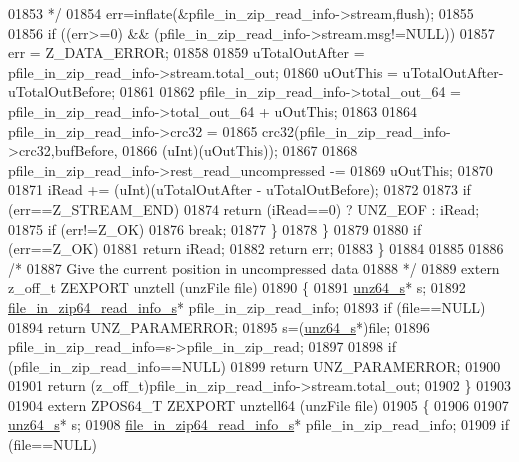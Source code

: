\begin{DoxyCode}
01853 \textcolor{comment}{            */}
01854             err=inflate(&pfile\_in\_zip\_read\_info->stream,flush);
01855 
01856             \textcolor{keywordflow}{if} ((err>=0) && (pfile\_in\_zip\_read\_info->stream.msg!=NULL))
01857               err = Z\_DATA\_ERROR;
01858 
01859             uTotalOutAfter = pfile\_in\_zip\_read\_info->stream.total\_out;
01860             uOutThis = uTotalOutAfter-uTotalOutBefore;
01861 
01862             pfile\_in\_zip\_read\_info->total\_out\_64 = pfile\_in\_zip\_read\_info->total\_out\_64 + uOutThis;
01863 
01864             pfile\_in\_zip\_read\_info->crc32 =
01865                 crc32(pfile\_in\_zip\_read\_info->crc32,bufBefore,
01866                         (uInt)(uOutThis));
01867 
01868             pfile\_in\_zip\_read\_info->rest\_read\_uncompressed -=
01869                 uOutThis;
01870 
01871             iRead += (uInt)(uTotalOutAfter - uTotalOutBefore);
01872 
01873             \textcolor{keywordflow}{if} (err==Z\_STREAM\_END)
01874                 \textcolor{keywordflow}{return} (iRead==0) ? UNZ\_EOF : iRead;
01875             \textcolor{keywordflow}{if} (err!=Z\_OK)
01876                 \textcolor{keywordflow}{break};
01877         \}
01878     \}
01879 
01880     \textcolor{keywordflow}{if} (err==Z\_OK)
01881         \textcolor{keywordflow}{return} iRead;
01882     \textcolor{keywordflow}{return} err;
01883 \}
01884 
01885 
01886 \textcolor{comment}{/*}
01887 \textcolor{comment}{  Give the current position in uncompressed data}
01888 \textcolor{comment}{*/}
01889 \textcolor{keyword}{extern} z\_off\_t ZEXPORT unztell (unzFile file)
01890 \{
01891     \hyperlink{structunz64__s}{unz64\_s}* s;
01892     \hyperlink{structfile__in__zip64__read__info__s}{file\_in\_zip64\_read\_info\_s}* pfile\_in\_zip\_read\_info;
01893     \textcolor{keywordflow}{if} (file==NULL)
01894         \textcolor{keywordflow}{return} UNZ\_PARAMERROR;
01895     s=(\hyperlink{structunz64__s}{unz64\_s}*)file;
01896     pfile\_in\_zip\_read\_info=s->pfile\_in\_zip\_read;
01897 
01898     \textcolor{keywordflow}{if} (pfile\_in\_zip\_read\_info==NULL)
01899         \textcolor{keywordflow}{return} UNZ\_PARAMERROR;
01900 
01901     \textcolor{keywordflow}{return} (z\_off\_t)pfile\_in\_zip\_read\_info->stream.total\_out;
01902 \}
01903 
01904 \textcolor{keyword}{extern} ZPOS64\_T ZEXPORT unztell64 (unzFile file)
01905 \{
01906 
01907     \hyperlink{structunz64__s}{unz64\_s}* s;
01908     \hyperlink{structfile__in__zip64__read__info__s}{file\_in\_zip64\_read\_info\_s}* pfile\_in\_zip\_read\_info;
01909     \textcolor{keywordflow}{if} (file==NULL)

\end{DoxyCode}
